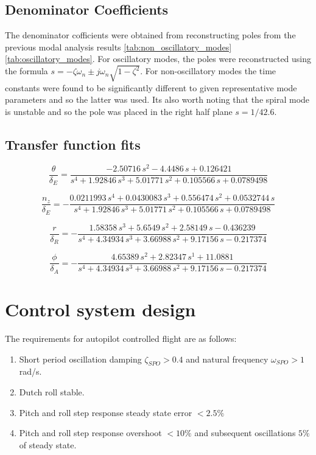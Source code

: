 \documentclass{article}
\begin{document}
\subsection{Denominator Coefficients}

The denominator cofficients were obtained from reconstructing poles from the previous modal analysis results \ref{tab:non_oscillatory_modes} \ref{tab:oscillatory_modes}.
For oscillatory modes, the poles were reconstructed using the formula $s = -\zeta\omega_n \pm j\omega_n\sqrt{1-\zeta^2}$.
For non-oscillatory modes the time constants were found to be significantly different to given representative mode parameters \cite{rep} and so the latter was used.
Its also worth noting that the spiral mode is unstable and so the pole was placed in the right half plane $s = 1/42.6$.


\subsection{Transfer function fits}

\begin{equation}
    \frac{\theta}{\delta_E} =
    \frac{-2.50716\,s^2-4.4486\,s+0.126421}{s^4+1.92846\,s^3+5.01771\,s^2+0.105566\,s+0.0789498}
    \label{eq:pitch_elev}
\end{equation}

\begin{equation}
    \frac{n_z}{\delta_E} =
    -\frac{0.0211993\,s^4+0.0430083\,s^3+0.556474\,s^2+0.0532744\,s}{s^4+1.92846\,s^3+5.01771\,s^2+0.105566\,s+0.0789498}
    \label{eq:naccel_elev}
\end{equation}

\begin{equation}
    \frac{r}{\delta_R} =
    -\frac{1.58358\,s^3+5.6549\,s^2+2.58149\,s-0.436239}{s^4+4.34934\,s^3+3.66988\,s^2+9.17156\,s-0.217374}
    \label{eq:yaw_rud}
\end{equation}

\begin{equation}
    \frac{\phi}{\delta_A} =
    -\frac{4.65389\,s^2+2.82347\,s^1+11.0881}{s^4+4.34934\,s^3+3.66988\,s^2+9.17156\,s-0.217374}
    \label{eq:roll_ail}
\end{equation}


\section{Control system design}

The requirements for autopilot controlled flight are as follows:
\begin{enumerate}
    \renewcommand{\labelenumi}{\alph{enumi})}
    \item Short period oscillation damping $\zeta_{SPO} > 0.4$ and natural frequency $\omega_{SPO} > 1$ rad/s.
    \item Dutch roll stable. \label{req:DR}
    \item Pitch and roll step response steady state error $< 2.5 \%$
    \item Pitch and roll step response overshoot $< 10 \%$ and subsequent oscillations $5 \%$ of steady state.
\end{enumerate}
\end{document}
